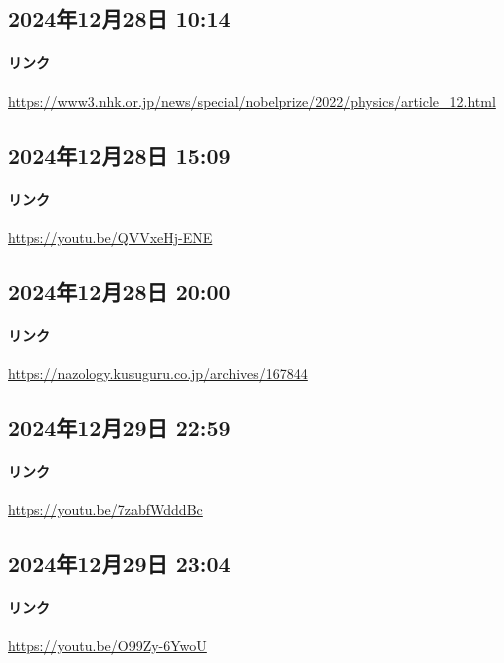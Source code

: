 \subsection*{2024年12月28日 10:14}

\paragraph{リンク}
\url{https://www3.nhk.or.jp/news/special/nobelprize/2022/physics/article_12.html}

\subsection*{2024年12月28日 15:09}

\paragraph{リンク}
\url{https://youtu.be/QVVxeHj-ENE}

\subsection*{2024年12月28日 20:00}

\paragraph{リンク}
\url{https://nazology.kusuguru.co.jp/archives/167844}

\subsection*{2024年12月29日 22:59}

\paragraph{リンク}
\url{https://youtu.be/7zabfWdddBc}

\subsection*{2024年12月29日 23:04}

\paragraph{リンク}
\url{https://youtu.be/O99Zy-6YwoU}

